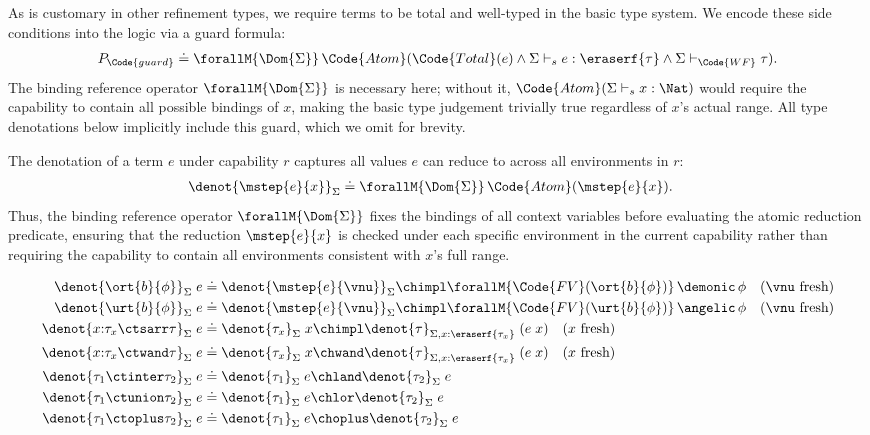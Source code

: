 As is customary in other refinement types, we require terms to be
total and well-typed in the basic type system.  We encode these side
conditions into the logic via a guard formula:
\begin{align*}
  P_{\Code{guard}} \doteq \forallM{\Dom{\Sigma}}\,\Code{Atom}(\Code{Total}(e) \land \Sigma \vdash_s e : \eraserf{\tau} \land \Sigma \vdash_{\Code{WF}} \tau).
\end{align*}
The binding reference operator $\forallM{\Dom{\Sigma}}$ is necessary here;
without it, $\Code{Atom}(\Sigma \vdash_s x : \Nat)$ would require the
capability to contain all possible bindings of $x$, making the basic
type judgement trivially true regardless of $x$'s actual range.  All
type denotations below implicitly include this guard, which we omit for
brevity.

The denotation of a term $e$ under capability $r$ captures all values
$e$ can reduce to across all environments in $r$:
\begin{align*}
  \denot{\mstep{e}{x}}_\Sigma &\doteq \forallM{\Dom{\Sigma}}\,\Code{Atom}(\mstep{e}{x}).
\end{align*}
Thus, the binding reference operator $\forallM{\Dom{\Sigma}}$ fixes the
bindings of all context variables before evaluating the atomic
reduction predicate, ensuring that the reduction $\mstep{e}{x}$ is
checked under each specific environment in the current capability
rather than requiring the capability to contain all environments
consistent with $x$'s full range.

\begin{definition}\label{def:type-denotation}
  \begin{align*}
    \denot{\ort{b}{\phi}}_\Sigma\;e &\doteq \denot{\mstep{e}{\vnu}}_\Sigma \chimpl \forallM{\Code{FV}(\ort{b}{\phi})}\,\demonic\,\phi \quad \text{($\vnu$ fresh)}
    \\\denot{\urt{b}{\phi}}_\Sigma\;e &\doteq \denot{\mstep{e}{\vnu}}_\Sigma \chimpl \forallM{\Code{FV}(\urt{b}{\phi})}\,\angelic\,\phi \quad \text{($\vnu$ fresh)}
    \\\denot{x{:}\tau_x \ctsarr \tau}_\Sigma\;e &\doteq \denot{\tau_x}_\Sigma\;x \chimpl \denot{\tau}_{\Sigma,x{:}\eraserf{\tau_x}}\;(e\;x) \quad \text{($x$ fresh)}
    \\\denot{x{:}\tau_x \ctwand \tau}_\Sigma\;e &\doteq \denot{\tau_x}_\Sigma\;x \chwand \denot{\tau}_{\Sigma,x{:}\eraserf{\tau_x}}\;(e\;x) \quad \text{($x$ fresh)}
    \\\denot{\tau_1 \ctinter \tau_2}_\Sigma\;e &\doteq \denot{\tau_1}_\Sigma\;e \chland \denot{\tau_2}_\Sigma\;e
    \\\denot{\tau_1 \ctunion \tau_2}_\Sigma\;e &\doteq \denot{\tau_1}_\Sigma\;e \chlor \denot{\tau_2}_\Sigma\;e
    \\\denot{\tau_1 \ctoplus \tau_2}_\Sigma\;e &\doteq \denot{\tau_1}_\Sigma\;e \choplus \denot{\tau_2}_\Sigma\;e
  \end{align*}
\end{definition}

